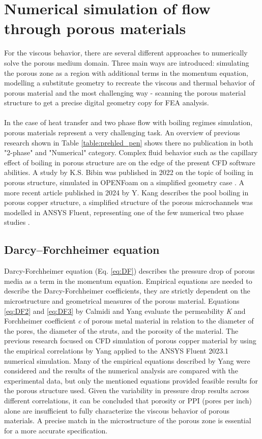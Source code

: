 \documentclass[a4paper]{article}
\begin{document}
\section{Numerical simulation of flow through porous materials}
For the viscous behavior, there are several different approaches to numerically solve the porous medium domain.
Three main ways are introduced: simulating the porous zone as a region with additional terms in the momentum equation, modelling a substitute geometry to recreate the viscous and thermal behavior of porous material and the most challenging way - scanning the porous material structure to get a precise digital geometry copy for FEA analysis.
\\
\\
\noindent In the case of heat transfer and two phase flow with boiling regimes simulation, porous materials represent a very challenging task.
An overview of previous research shown in Table \ref{table:prehled_pen} shows there no publication in both "2-phase" and "Numerical" category.
Complex fluid behavior such as the capillary effect of boiling in porous structure are on the edge of the present CFD software abilities.
A study by K.S. Bibin was published in 2022 on the topic of boiling in porous structure, simulated in OPENFoam on a simplified geometry case \cite{Bibin2022}. 
A more recent article published in 2024 by Y. Kang describes the pool boiling in porous copper structure, a simplified structure of the porous microchannels was modelled in ANSYS Fluent, representing one of the few numerical two phase studies \cite{Kang2024}.

\subsection{Darcy–Forchheimer equation}
Darcy-Forchheimer equation (Eq. \ref{eq:DF}) describes the pressure drop of porous media as a term in the momentum equation.
Empirical equations are needed to describe the Darcy-Forchheimer coefficients, they are strictly dependent on the microstructure and geometrical measures of the porous material.
Equations \ref{eq:DF2} and \ref{eq:DF3} by Calmidi \cite{Calmidi} and Yang \cite{Yang2021} evaluate the permeability \textit{K} and Forchheimer coefficient \textit{c} of porous metal material in relation to the diameter of the pores, the diameter of the struts, and the porosity of the material.
The previous research focused on CFD simulation of porous copper material by using the empirical correlations by Yang\cite{Yang2021} applied to the ANSYS Fluent 2023.1 numerical simulation.
Many of the empirical equations described by Yang were considered and the results of the numerical analysis are compared with the experimental data, but only the mentioned equations provided feasible results for the porous structure used.
Given the variability in pressure drop results across different correlations, it can be concluded that porosity or PPI (pores per inch) alone are insufficient to fully characterize the viscous behavior of porous materials. A precise match in the microstructure of the porous zone is essential for a more accurate specification.\\
\\
\end{document}
